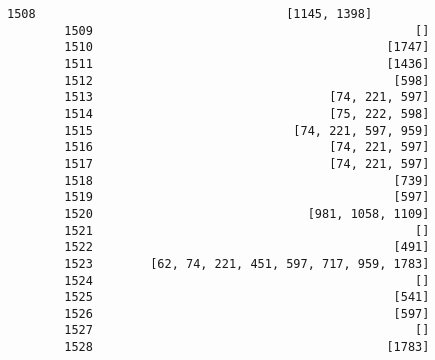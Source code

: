 \documentclass[11pt]{article}
\begin{document}
\begin{Verbatim}[commandchars=\\\{\}]
        1508                                   [1145, 1398]   
        1509                                             []   
        1510                                         [1747]   
        1511                                         [1436]   
        1512                                          [598]   
        1513                                 [74, 221, 597]   
        1514                                 [75, 222, 598]   
        1515                            [74, 221, 597, 959]   
        1516                                 [74, 221, 597]   
        1517                                 [74, 221, 597]   
        1518                                          [739]   
        1519                                          [597]   
        1520                              [981, 1058, 1109]   
        1521                                             []   
        1522                                          [491]   
        1523        [62, 74, 221, 451, 597, 717, 959, 1783]   
        1524                                             []   
        1525                                          [541]   
        1526                                          [597]   
        1527                                             []   
        1528                                         [1783]   
        

\end{Verbatim}
\end{document}
